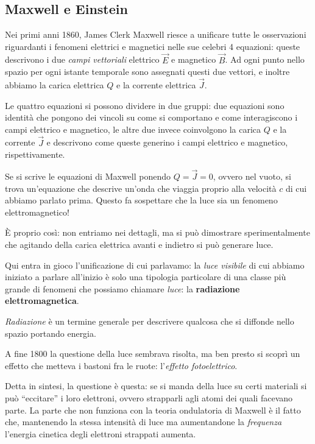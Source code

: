 \documentclass{article}
\begin{document}
\subsection{Maxwell e Einstein}

Nei primi anni 1860, James Clerk Maxwell riesce a unificare tutte le osservazioni riguardanti i fenomeni elettrici e magnetici nelle sue celebri 4 equazioni: queste descrivono i due \emph{campi vettoriali} elettrico \(\vec{E}\) e magnetico \(\vec{B}\). 
Ad ogni punto nello spazio per ogni istante temporale sono assegnati questi due vettori, e inoltre abbiamo la carica elettrica \(Q\) e la corrente elettrica \(\vec{J}\). 

Le quattro equazioni si possono dividere in due gruppi: due equazioni sono identità che pongono dei vincoli su come si comportano e come interagiscono i campi elettrico e magnetico, le altre due invece coinvolgono la carica \(Q\) e la corrente \(\vec{J}\) e descrivono come queste generino i campi elettrico e magnetico, rispettivamente. 

Se si scrive le equazioni di Maxwell ponendo \(Q = \vec{J} = 0\), ovvero nel vuoto, si trova un'equazione che descrive un'onda che viaggia proprio alla velocità \(c\) di cui abbiamo parlato prima. 
Questo fa sospettare che la luce sia un fenomeno elettromagnetico! 

È proprio così: non entriamo nei dettagli, ma si può dimostrare sperimentalmente che agitando della carica elettrica avanti e indietro si può generare luce.

Qui entra in gioco l'unificazione di cui parlavamo: la \emph{luce visibile} di cui abbiamo iniziato a parlare all'inizio è solo una tipologia particolare di una classe più grande di fenomeni che possiamo chiamare \emph{luce}: la \textbf{radiazione elettromagnetica}.

\emph{Radiazione} è un termine generale per descrivere qualcosa che si diffonde nello spazio portando energia.


A fine 1800 la questione della luce sembrava risolta, ma ben presto si scoprì un effetto che metteva i bastoni fra le ruote: l'\emph{effetto fotoelettrico}.

Detta in sintesi, la questione è questa: se si manda della luce su certi materiali si può ``eccitare'' i loro elettroni, ovvero strapparli agli atomi dei quali facevano parte.
La parte che non funziona con la teoria ondulatoria di Maxwell è il fatto che, mantenendo la stessa intensità di luce ma aumentandone la \emph{frequenza} l'energia cinetica degli elettroni strappati aumenta. 
\end{document}
